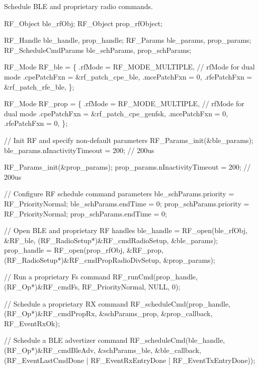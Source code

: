 Schedule B\+L\+E and proprietary radio commands. 
\begin{DoxyCode}
RF_Object ble\_rfObj;
RF_Object prop\_rfObject;

RF_Handle ble\_handle, prop\_handle;
RF_Params ble\_params, prop\_params;
RF_ScheduleCmdParams ble\_schParams, prop\_schParams;

RF_Mode RF\_ble =
\{
    .rfMode      = RF\_MODE\_MULTIPLE,  \textcolor{comment}{// rfMode for dual mode}
    .cpePatchFxn = &rf\_patch\_cpe\_ble,
    .mcePatchFxn = 0,
    .rfePatchFxn = &rf\_patch\_rfe\_ble,
\};

RF_Mode RF\_prop =
\{
    .rfMode      = RF\_MODE\_MULTIPLE,  \textcolor{comment}{// rfMode for dual mode}
    .cpePatchFxn = &rf\_patch\_cpe\_genfsk,
    .mcePatchFxn = 0,
    .rfePatchFxn = 0,
\};

\textcolor{comment}{// Init RF and specify non-default parameters}
RF_Params_init(&ble\_params);
ble\_params.nInactivityTimeout = 200;     \textcolor{comment}{// 200us}

RF_Params_init(&prop\_params);
prop\_params.nInactivityTimeout = 200;    \textcolor{comment}{// 200us}

\textcolor{comment}{// Configure RF schedule command parameters}
ble\_schParams.priority  = RF_PriorityNormal;
ble\_schParams.endTime   = 0;
prop\_schParams.priority = RF_PriorityNormal;
prop\_schParams.endTime  = 0;

\textcolor{comment}{// Open BLE and proprietary RF handles}
ble\_handle  = RF_open(ble\_rfObj, &RF\_ble, (RF_RadioSetup*)&RF\_cmdRadioSetup, &ble\_params);
prop\_handle = RF_open(prop\_rfObj, &RF\_prop, (RF_RadioSetup*)&RF\_cmdPropRadioDivSetup, &prop\_params);

\textcolor{comment}{// Run a proprietary Fs command}
RF_runCmd(prop\_handle, (RF_Op*)&RF\_cmdFs, RF_PriorityNormal, NULL, 0);

\textcolor{comment}{// Schedule a proprietary RX command}
RF_scheduleCmd(prop\_handle, (RF_Op*)&RF\_cmdPropRx, &schParams\_prop, &prop\_callback, 
      RF_EventRxOk);

\textcolor{comment}{// Schedule a BLE advertizer command}
RF_scheduleCmd(ble\_handle, (RF_Op*)&RF\_cmdBleAdv, &schParams\_ble, &ble\_callback,
               (RF_EventLastCmdDone | RF_EventRxEntryDone | RF_EventTxEntryDone));
\end{DoxyCode}





